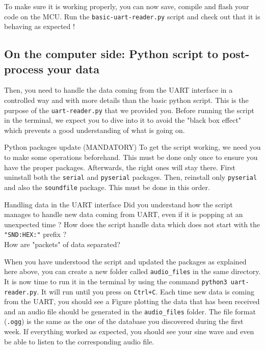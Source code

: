 \noindent To make sure it is working properly, you can now save, compile and flash your code on the MCU. Run the \texttt{basic-uart-reader.py} script and check out that it is behaving as expected !

\subsection*{On the computer side: Python script to post-process your data}

Then, you need to handle the data coming from the UART interface in a controlled way and with more details than the basic python script. This is the purpose of the \texttt{uart-reader.py} that we provided you. Before running the script in the terminal, we expect you to dive into it to avoid the "black box effect" which prevents a good understanding of what is going on.

\begin{bclogo}[couleur = gray!20, arrondi = 0.2, logo=\bcattention]{Python packages update (MANDATORY)}
To get the script working, we need you to make some operations beforehand. This must be done only once to ensure you have the proper packages. Afterwards, the right ones will stay there. First uninstall both the \texttt{serial} and \texttt{pyserial} packages. Then, reinstall only \texttt{pyserial} and also the \texttt{soundfile} package. This must be done in this order.
\end{bclogo}

\begin{bclogo}[couleur = gray!20, arrondi = 0.2, logo=\bcquestion]{Handling data in the UART interface}
Did you understand how the script manages to handle new data coming from UART, even if it is popping at an unexpected time ? How does the script handle data which does not start with the \texttt{"SND:HEX:"} prefix ? \\

\noindent How are "packets" of data separated?
\end{bclogo}

\noindent When you have understood the script and updated the packages as explained here above, you can create a new folder called \texttt{audio\_files} in the same directory. It is now time to run it in the terminal by using the command \texttt{python3 uart-reader.py}. It will run until you press on \texttt{Ctrl+C}. Each time new data is coming from the UART, you should see a Figure plotting the data that has been received and an audio file should be generated in the \texttt{audio\_files} folder. The file format (\texttt{.ogg}) is the same as the one of the database you discovered during the first week. If everything worked as expected, you should see your sine wave and even be able to listen to the corresponding audio file.

